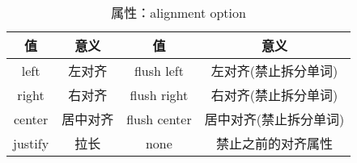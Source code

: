 \begin{table}[H]
    \centering
    \caption{属性：alignment option}
    \label{table:alignment option}
    \setlength{\tabcolsep}{8mm}
    \begin{tabular}{c|cc|c}
        \toprule
        \textbf{值} & \textbf{意义} & \textbf{值} & \textbf{意义} \\
        \midrule
        left & 左对齐 & flush left & 左对齐(禁止拆分单词) \\
        right & 右对齐 & flush right & 右对齐(禁止拆分单词) \\
        center & 居中对齐 & flush center & 居中对齐(禁止拆分单词) \\
        justify & 拉长 & none & 禁止之前的对齐属性 \\
        \bottomrule
    \end{tabular}
\end{table}